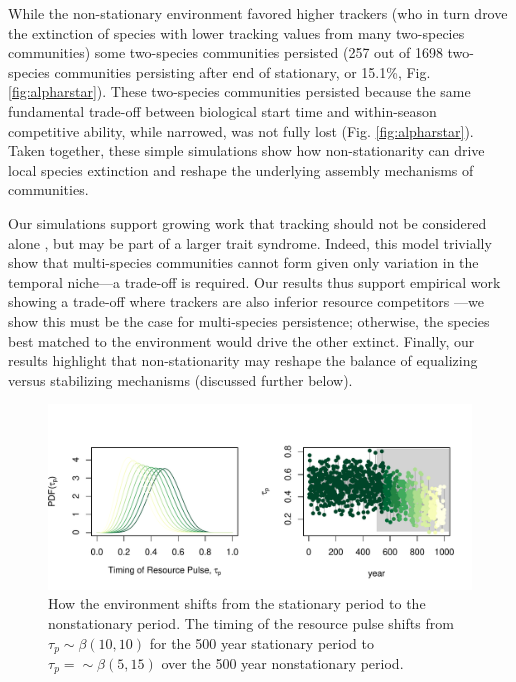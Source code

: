 \documentclass[11pt,letterpaper]{article}
\begin{document}
While the non-stationary environment favored higher trackers (who in turn drove the extinction of species with lower tracking values from many two-species communities) some two-species communities persisted (257 out of 1698 two-species communities persisting after end of stationary, or 15.1\%, Fig. \ref{fig:alpharstar}). These two-species communities persisted because the same fundamental trade-off between biological start time and within-season competitive ability, while narrowed, was not fully lost (Fig. \ref{fig:alpharstar}). Taken together, these simple simulations show how non-stationarity can drive local species extinction and reshape the underlying assembly mechanisms of communities.

Our simulations support growing work that tracking should not be considered alone \citep{Diamond:2011nx,Dorji2013,Ishioka2013,kharouba2014,du2017}, but may be part of a larger trait syndrome. Indeed, this model trivially show that multi-species communities cannot form given only variation in the temporal niche---a trade-off is required. Our results thus support empirical work showing a trade-off where trackers are also inferior resource competitors \citep{lasky2016,Zhu2016BioLetters}---we show this must be the case for multi-species persistence; otherwise, the species best matched to the environment would drive the other extinct. Finally, our results highlight that non-stationarity may reshape the balance of equalizing versus stabilizing mechanisms (discussed further below). 

\begin{figure}[t!]
\centering
\includegraphics[width=1\textwidth]{..//..//..//R/graphs/modelruns/manuscript/modelsupp.pdf}
\caption{How the environment shifts from the stationary period to the nonstationary period. The timing of the resource pulse shifts from $\tau_{p} \sim \beta(10,10)$ for the 500 year stationary period to $\tau_{p}=\sim \beta(5,15)$ over the 500 year nonstationary period.}
\label{fig:figR0}
\end{figure}
\end{document}
